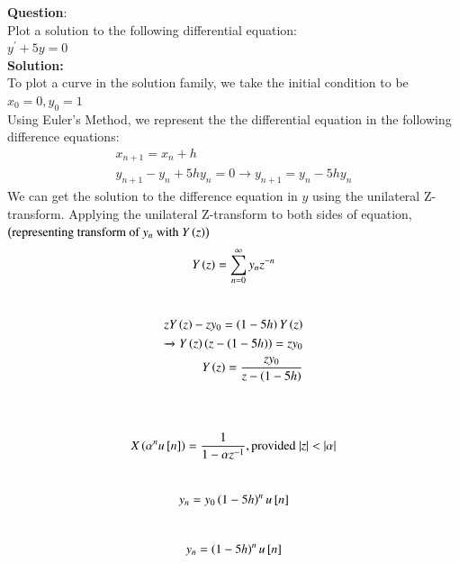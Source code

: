 \documentclass[journal]{IEEEtran}
\begin{document}
\textbf{Question}:\\
Plot a solution to the following differential equation:\\
    $y^\prime + 5y = 0$
\\
\textbf{Solution: }\\
To plot a curve in the solution family, we take the initial condition to be\\
$x_0 = 0, y_0 = 1$\\
Using Euler's Method, we represent the the differential equation in the following difference equations:
\begin{align}
x_{n+1} = x_n + h\\
    y_{n+1} - y_n + 5hy_n  = 0 \xrightarrow{} y_{n+1} = y_n - 5hy_n
\end{align}
We can get the solution to the difference equation in $y$ using the unilateral Z-transform.
Applying the unilateral Z-transform to both sides of equation,$\left(\text{representing transform of $y_n$ with $Y\left(z\right)$}\right)$ 
\begin{align}
    Y\left(z\right) = \sum_{n=0}^{\infty}y_nz^{-n}\\
\end{align}
    \\
\begin{align}
    zY\left(z\right) -zy_0 = \left(1-5h\right)Y\left(z\right)\\
    \xrightarrow{} Y\left(z\right)\left(z - \left(1-5h\right)\right) = zy_0\\
    Y\left(z\right) = \frac{zy_0}{z-\left(1-5h\right)}\\
\end{align}
    \\
    \\
\begin{align}
    X\left(\alpha^nu{}\left[n\right]\right) = \frac{1}{1-\alpha z^{-1}}, \text{provided $|z| < |\alpha|$}\\
\end{align}
    \\
\begin{align}
    y_n = y_0\left(1-5h\right)^nu{}\left[n\right]\\
\end{align}
    \\
\begin{align}
    y_n = \left(1-5h\right)^nu{}\left[n\right]\\
\end{align}
\end{document}
